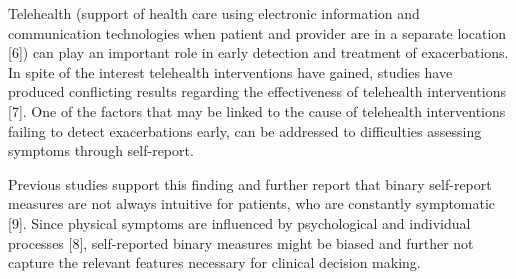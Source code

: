 %
%

Telehealth (support of health care using electronic information and communication technologies when patient and provider are in a separate location [6]) can play an important role in early detection and treatment of exacerbations. In spite of the interest telehealth interventions have gained, studies have produced conflicting results regarding the effectiveness of telehealth interventions [7]. One of the factors that may be linked to the cause of telehealth interventions failing to detect exacerbations early, can be addressed to difficulties assessing symptoms through self-report. 

Previous studies support this finding and further report that binary self-report measures are not always intuitive for patients, who are constantly symptomatic [9]. Since physical symptoms are influenced by psychological and individual processes [8], self-reported binary measures might be biased and further not capture the relevant features necessary for clinical decision making.  


%
%

%
%


